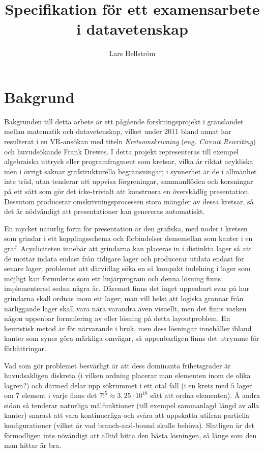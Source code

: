 \documentclass{article}
\begin{document}
\title{Specifikation f\"or ett examensarbete i datavetenskap}
\author{Lars Hellstr\"om}
\maketitle

\section{Bakgrund}

Bakgrunden till detta arbete \"ar ett p\r{a}g\r{a}ende 
forskningsprojekt i gr\"anslandet mellan matematik och datavetenskap, 
vilket under 2011 bland annat har resulterat i en VR-ans\"okan med 
titeln \emph{Kretsomskrivning} (eng. \emph{Circuit Rewriting}) och 
huvuds\"okande Frank Drewes. I detta projekt representeras till 
exempel algebraiska uttryck eller programfragment som kretsar, vilka 
\"ar riktat acykliska men i \"ovrigt saknar grafstrukturella 
begr\"ansningar; i synnerhet \"ar de i allm\"anhet inte tr\"ad, utan 
tenderar att uppvisa f\"orgreningar, sammanfl\"oden och korsningar 
p\r{a} ett s\"att som g\"or det icke-trivialt att konstruera en 
\"oversk\r{a}dlig presentation. Dessutom producerar 
omskrivningsprocessen stora m\"angder av dessa kretsar, s\r{a} det 
\"ar n\"odv\"andigt att presentationer kan genereras automatiskt.

En mycket naturlig form f\"or presentation \"ar den grafiska, med 
noder i kretsen som grindar i ett kopplingsschema och 
f\"orbindelser dememellan som kanter i en graf. Acycliciteten 
inneb\"ar att grindarna kan placeras in i distinkta lager s\r{a} att 
de mottar indata endast fr\r{a}n tidigare lager och producerar utdata 
endast f\"or senare lager; problemet att d\"arvidlag s\"oka en s\r{a} 
kompakt indelning i lager som m\"ojligt kan formuleras som ett 
linj\"arprogram och denna l\"osning finns implementerad sedan 
n\r{a}gra \r{a}r. D\"aremot finns det inget uppenbart svar p\r{a} hur 
grindarna skall ordnas inom ett lager; man vill helst att logiska 
grannar fr\r{a}n n\"arliggande lager skall vara n\"ara varandra 
\"aven visuellt, men det finns varken n\r{a}gon uppenbar formulering 
av eller l\"osning p\r{a} detta layoutproblem. En heuristisk metod 
\"ar f\"or n\"arvarande i bruk, men dess l\"osningar inneh\r{a}ller 
ibland kanter som synes g\"ora m\"arkliga omv\"agar, s\r{a} 
uppenbarligen finns det utrymme f\"or f\"orb\"attringar.

Vad som g\"or problemet besv\"arligt \"ar att dess dominanta 
frihetsgrader \"ar huvudsakligen diskreta (i vilken ordning placerar 
man elementen inom de olika lagren?) och d\"armed delar upp 
s\"okrummet i ett otal fall (i en krets med $5$ lager om $7$ element i 
varje finns det \(7!^5 \approx 3{,}25 \cdot 10^{18}\) s\"att att 
ordna elementen). \r{A} andra sidan s\r{a} tenderar naturliga 
m\r{a}lfunktioner (till exempel sammanlagd l\"angd av alla kanter) 
snarast att vara kontinuerliga och sv\r{a}ra att uppskatta 
utifr\r{a}n partiella konfigurationer (vilket \"ar vad 
branch-and-bound skulle beh\"ova). Slutligen \"ar det f\"ormodligen 
inte n\"ov\"andigt att alltid hitta den b\"asta l\"osningen, s\r{a} 
l\"ange som den man hittar \"ar bra.
\end{document}

